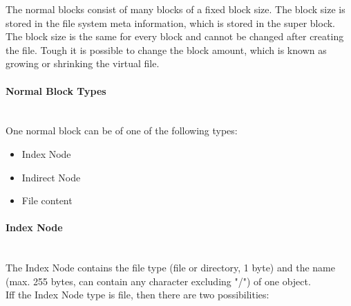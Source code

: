 \documentclass[a4paper,12pt]{article}
\begin{document}
The normal blocks consist of many blocks of a fixed block size. The block size is stored in the file system meta information, which is stored in the super block. The block size is the same for every block and cannot be changed after creating the file. Tough it is possible to change the block amount, which is known as growing or shrinking the virtual file.

\paragraph{Normal Block Types} ~\\

\noindent One normal block can be of one of the following types:

\begin{itemize}
  \item Index Node
  \item Indirect Node
  \item File content
\end{itemize}

\paragraph{Index Node} ~\\

The Index Node contains the file type (file or directory, 1 byte) and the name (max. 255 bytes, can contain any character excluding "/") of one object.\\

Iff the Index Node type is file, then there are two possibilities:
\end{document}
